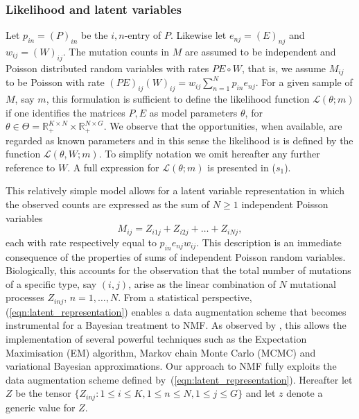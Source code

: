 \documentclass{bioinfo}
\begin{document}
\subsubsection{Likelihood and latent variables}
Let $p_{in} = (P)_{in}$ be the $i,n$-entry of $P$. Likewise let
$e_{nj} = (E)_{nj}$ and $w_{ij} = (W)_{ij}$.  The mutation counts in
$M$ are assumed to be independent and Poisson distributed random
variables with rates $PE\circ W$, that is, we assume $M_{ij}$ to be
Poisson with rate $(PE)_{ij}(W)_{ij} = w_{ij}\sum_{n=1}^N
p_{in}e_{nj}$. For a given sample of $M$, say $m$, this formulation is
sufficient to define the likelihood function $\mathcal L(\theta; m)$
if one identifies the matrices $P, E$ as model parameters $\theta$,
for $\theta \in \Theta = \mathbb R_+^{K\times N}\times \mathbb 
R_+^{N\times G}$. We observe that the opportunities, when available,
are regarded as known parameters and in this sense the likelihood is
is  defined by the function $\mathcal L(\theta, W; m)$. To simplify 
notation we omit hereafter any further reference to $W$. A full
expression for $\mathcal L(\theta; m)$ is presented in ($s_1$).


This relatively simple model allows for a latent variable
representation in which the observed counts are expressed as the sum
of $N\geqslant 1$ independent Poisson variables
\begin{equation}
  \label{eqn:latent_representation}
   M_{ij} = Z_{i1j} + Z_{i2j} + \ldots + Z_{iNj},
\end{equation} 
each with rate respectively equal to $p_{in}e_{nj}w_{ij}$. This
description is an immediate consequence of the properties of sums of
independent Poisson random variables. Biologically, this accounts for
the observation that the total number of mutations of a specific type,
say $(i,j)$, arise as the linear combination of $N$ mutational
processes $Z_{inj}$, $n = 1, \ldots, N$. From a statistical
perspective, (\ref{eqn:latent_representation}) enables a data
augmentation scheme that becomes instrumental for a Bayesian treatment
to NMF. As observed by \cite{C}, this allows the implementation of
several powerful techniques such as the Expectation Maximisation (EM)
algorithm, Markov chain Monte Carlo (MCMC) and variational Bayesian
approximations.  Our approach to NMF fully exploits the
data augmentation scheme defined
by~(\ref{eqn:latent_representation}).  Hereafter let $Z$  be the
tensor $\{Z_{inj}:
1\leqslant i\leqslant K, 1\leqslant n \leqslant N, 1\leqslant
j\leqslant G\}$ and let $z$ denote a generic value for $Z$.
\end{document}
